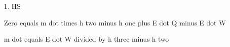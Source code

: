 1. HS

Zero equals m dot times h two minus h one plus E dot Q minus E dot W

m dot equals E dot W divided by h three minus h two